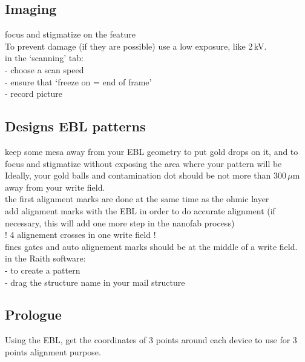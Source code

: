 \subsection{Imaging}

focus and stigmatize on the feature\\

To prevent damage (if they are possible) use a  low exposure, like 2\,kV.\\

in the `scanning' tab:\\
- choose a scan speed\\
- ensure that `freeze on = end of frame'\\
- record picture\\


\subsection{Designs EBL patterns}

keep some mesa away from your EBL geometry to put gold drops on it, and to focus and stigmatize without exposing the area where your pattern will be\\
Ideally, your gold balls and contamination dot should be not more than 300\,$\mu$m away from your write field.\\

the first alignment marks are done at the same time as the ohmic layer\\

add alignment marks with the EBL in order to do accurate alignment (if necessary, this will add one more step in the nanofab process)\\
! 4 alignement crosses in one write field !\\

fines gates and auto alignement marks should be at the middle of a write field.\\

in the Raith software:\\
-  to create a pattern\\
- drag the structure name in your mail structure\\


\subsection{Prologue}

Using the EBL, get the coordinates of 3 points around each device to use for 3 points alignment purpose.\\

